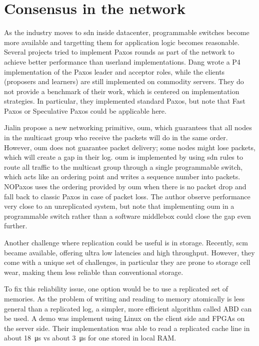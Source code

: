 \section{Consensus in the network}

As the industry moves to \gls{sdn} inside datacenter, programmable switches become more available and targetting them for application logic becomes reasonable.
Several projects tried to implement Paxos rounds as part of the network to achieve better performance than userland implementations.
Dang \etal wrote a P4 implementation of the Paxos leader and acceptor roles\cite{paxos_switchy}, while the clients (proposers and learners) are still implemented on commodity servers.
They do not provide a benchmark of their work, which is centered on implementation strategies.
In particular, they implemented standard Paxos, but note that Fast Paxos or Speculative Paxos could be applicable here.

Jialin \etal propose a new networking primitive, \gls{oum}, which guarantees that all nodes in the multicast group who receive the packets will do in the same order\cite{nopaxos}.
However, \gls{oum} does not guarantee packet delivery; some nodes might lose packets, which will create a gap in their log.
\Gls{oum} is implemented by using \gls{sdn} rules to route all traffic to the multicast group through a single programmable switch, which acts like an ordering point and writes a sequence number into packets.
NOPaxos uses the ordering provided by \gls{oum} when there is no packet drop and fall back to classic Paxos in case of packet loss.
The author observe performance very close to an unreplicated system, but note that implementing \gls{oum} in a programmable switch rather than a software middlebox could close the gap even further.

Another challenge where replication could be useful is in storage.
Recently, \gls{scm} became available, offering ultra low latencies and high throughput.
However, they come with a unique set of challenges, in particular they are prone to storage cell wear, making them less reliable than conventional storage.

To fix this reliability issue, one option would be to use a replicated set of memories.
As the problem of writing and reading to memory atomically is less general than a replicated log, a simpler, more efficient algorithm called ABD\cite{abd} can be used.
A demo was implement using Linux on the client side and FPGAs on the server side\cite{consensus_memory}.
Their implementation was able to read a replicated cache line in about \SI{18}{\micro\second} vs about \SI{3}{\micro\second} for one stored in local RAM.
